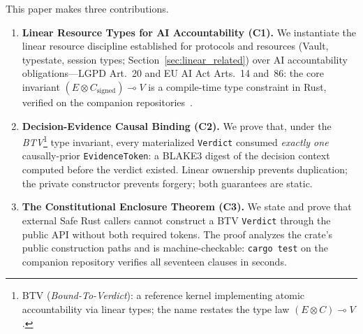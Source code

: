 This paper makes three contributions.
\begin{enumerate}
  \item \textbf{Linear Resource Types for AI Accountability (C1).}
    We instantiate the linear resource discipline established for protocols
    and resources (Vault, typestate, session types;
    Section~\ref{sec:linear_related}) over AI accountability
    obligations---LGPD Art.~20 and EU AI Act Arts.~14 and~86: the core
    invariant $(E \otimes C_{\text{signed}}) \multimap V$ is a compile-time
    type constraint in Rust, verified on the companion
    repositories~\cite{soares2026a, soares2026b}.

  \item \textbf{Decision-Evidence Causal Binding (C2).}
    We prove that, under the \emph{BTV}\footnote{BTV (\textit{Bound-To-Verdict}):
    a reference kernel implementing atomic accountability via linear types;
    the name restates the type law $(E \otimes C) \multimap V$.}
    type invariant, every materialized
    \texttt{Verdict} consumed \emph{exactly one} causally-prior
    \texttt{EvidenceToken}: a BLAKE3 digest of the decision context
    computed before the verdict existed.
    Linear ownership prevents duplication; the private constructor
    prevents forgery; both guarantees are static.

  \item \textbf{The Constitutional Enclosure Theorem (C3).}
    We state and prove that external Safe Rust callers cannot construct a
    BTV \texttt{Verdict} through the public API without both required tokens.
    The proof analyzes the crate's public construction paths and is
    machine-checkable: \texttt{cargo test} on the companion repository
    verifies all seventeen clauses in seconds.
\end{enumerate}
